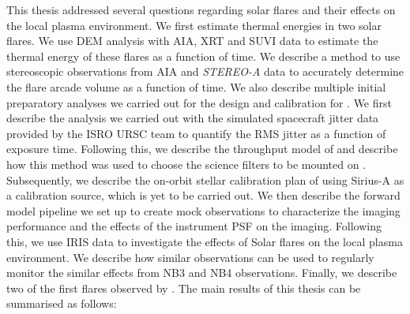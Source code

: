 This thesis addressed several questions regarding solar flares and their effects on the local plasma environment. We first estimate thermal energies in two solar flares. We use DEM analysis with AIA, XRT and SUVI data to estimate the thermal energy of these flares as a function of time. We describe a method to use stereoscopic observations from AIA and {\it STEREO-A} data to accurately determine the flare arcade volume as a function of time. We also describe multiple initial preparatory analyses we carried out for the design and calibration for {\suit}. We first describe the analysis we carried out with the simulated spacecraft jitter data provided by the ISRO URSC team to quantify the RMS jitter as a function of exposure time. Following this, we describe the throughput model of {\suit} and describe how this method was used to choose the science filters to be mounted on {\suit}. Subsequently, we describe the on-orbit stellar calibration plan of {\suit} using Sirius-A as a calibration source, which is yet to be carried out. We then describe the forward model pipeline we set up to create mock {\suit} observations to characterize the imaging performance and the effects of the instrument PSF on the imaging. Following this, we use IRIS  data to investigate the effects of Solar flares on the local plasma environment. We describe how similar observations can be used to regularly monitor the similar effects from {\suit} NB3 and NB4 observations. Finally, we describe two of the first flares observed by {\suit}. The main results of this thesis can be summarised as follows:

